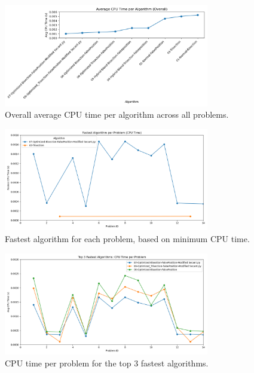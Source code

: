\documentclass[reprint, amsmath, amssymb, aps, prl]{revtex4-2}
\begin{document}
\begin{figure}[H]
    \centering
    \includegraphics[width=0.8\textwidth]{avg_cpu_time_lineplot_overall.png}
    \caption{Overall average CPU time per algorithm across all problems.}
    \label{fig:avg_cpu_time_lineplot_overall}
\end{figure}

\begin{figure}[H]
    \centering
    \includegraphics[width=0.8\textwidth]{fastest_algorithm_per_problem_lineplot.png}
    \caption{Fastest algorithm for each problem, based on minimum CPU time.}
    \label{fig:fastest_algorithm_per_problem}
\end{figure}

\begin{figure}[H]
    \centering
    \includegraphics[width=0.8\textwidth]{top3_fastest_algorithms_lineplot.png}
    \caption{CPU time per problem for the top 3 fastest algorithms.}
    \label{fig:top3_fastest_algorithms}
\end{figure}
\end{document}
